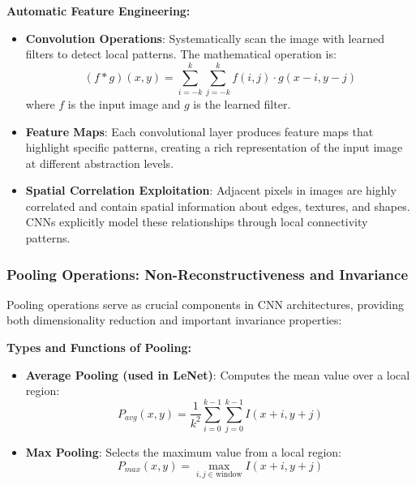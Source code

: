 \documentclass[a4paper, journal]{IEEEtran}
\begin{document}
\textbf{Automatic Feature Engineering:}
\begin{itemize}
    \item \textbf{Convolution Operations}: Systematically scan the image with learned filters to detect local patterns. The mathematical operation is:
          \begin{equation}
              (f * g)(x,y) = \sum_{i=-k}^{k} \sum_{j=-k}^{k} f(i,j) \cdot g(x-i, y-j)
          \end{equation}
          where $f$ is the input image and $g$ is the learned filter.

    \item \textbf{Feature Maps}: Each convolutional layer produces feature maps that highlight specific patterns, creating a rich representation of the input image at different abstraction levels.

    \item \textbf{Spatial Correlation Exploitation}: Adjacent pixels in images are highly correlated and contain spatial information about edges, textures, and shapes. CNNs explicitly model these relationships through local connectivity patterns.
\end{itemize}

\subsubsection{Pooling Operations: Non-Reconstructiveness and Invariance}

Pooling operations serve as crucial components in CNN architectures, providing both dimensionality reduction and important invariance properties:

\textbf{Types and Functions of Pooling:}
\begin{itemize}
    \item \textbf{Average Pooling (used in LeNet)}: Computes the mean value over a local region:
          \begin{equation}
              P_{avg}(x,y) = \frac{1}{k^2} \sum_{i=0}^{k-1} \sum_{j=0}^{k-1} I(x+i, y+j)
          \end{equation}

    \item \textbf{Max Pooling}: Selects the maximum value from a local region:
          \begin{equation}
              P_{max}(x,y) = \max_{i,j \in \text{window}} I(x+i, y+j)
          \end{equation}
\end{itemize}
\end{document}

